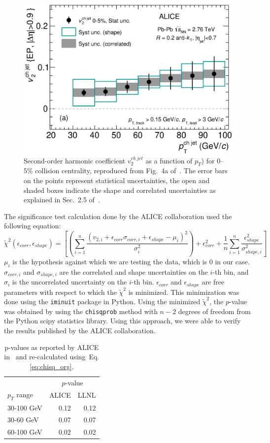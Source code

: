 \documentclass[11pt]{article}
\begin{document}
    \begin{figure}[h]
\begin{center}
        \includegraphics[width=.5\textwidth]{figures/data}
        \caption{Second-order harmonic coefficient $v_2^{ch\ jet}$ as a function of $p_T$) for 0--5\% collision centrality, reproduced from Fig.~4a of~\cite{Adam:2016ix}.  The error bars on the points represent statistical uncertainties, the open and shaded boxes indicate the shape and correlated uncertainties as explained in Sec.~2.5 of~\cite{Adam:2016ix}.}
        \label{fig:data}
\end{center}
    \end{figure}

The significance test calculation done by the ALICE collaboration used the following equation:
\begin{equation}\label{eq:chisq_org}
    \tilde{\chi}^2 (\epsilon_{corr}, \epsilon_{shape}) = \left[ \left( \sum_{i=1}^{n} \frac{(v_{2, i} + \epsilon_{corr} \sigma_{corr, i} + \epsilon_{shape} - \mu_i)^2}{\sigma^2_i} \right)+ \epsilon_{corr}^2 +  \frac{1}{n}\sum_{i=1}^{n} \frac{\epsilon_{shape}^2}{\sigma^2_{shape, i}}   \right]
\end{equation}
$\mu_i$ is the hypothesis against which we are testing the data, which is 0 in our case. $\sigma_{corr, i}$ and $\sigma_{shape, i}$ are the correlated and shape uncertainties on the $i$-th bin, and $\sigma_i$ is the uncorrelated uncertainty on the $i$-th bin. $\epsilon_{corr}$ and $\epsilon_{shape}$ are free parameters with respect to which the $\tilde{\chi}^2$ is minimized. This minimization was done using the \texttt{iminuit} package in Python. Using the minimized $\tilde{\chi}^2$, the $p$-value was obtained by using the \texttt{chisqprob} method with $n - 2$ degrees of freedom from the Python scipy statistics library. Using this approach, we were able to verify the results published by the ALICE collaboration.

\begin{table}[h]
\begin{center}
\begin{tabular}{ l r r }
  & \multicolumn{2}{c}{$p$-value} \\
$p_T$ range & ALICE & LLNL \\
\hline
30-100 GeV & 0.12 & 0.12 \\ 
30-60 GeV & 0.07 & 0.07 \\ 
60-100 GeV & 0.02 & 0.02 \\
\end{tabular}
\caption{p-values as reported by ALICE in~\cite{Adam:2016ix} and re-calculated using~Eq.\ref{eq:chisq_org}.}
\end{center}
\end{table}
\end{document}

